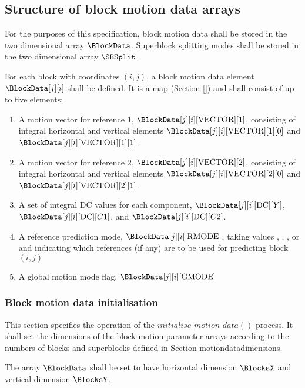 \subsection{Structure of block motion data arrays}

\label{motionconventions}

For the purposes of this specification, block motion data shall be stored in the 
two dimensional array $\BlockData$. Superblock
splitting modes shall be stored in the two dimensional array $\SBSplit$.

For each block with coordinates $(i,j)$, a block motion data element 
$\BlockData[j][i]$ shall be defined. It is a map (Section \ref{}) and shall
consist of up to five elements:

\begin{enumerate}
\item A motion vector for reference 1, $\BlockData[j][i][\Vect][1]$, consisting of 
integral horizontal and vertical elements $\BlockData[j][i][\Vect][1][0]$ and 
$\BlockData[j][i][\Vect][1][1]$.
\item A motion vector for reference 2, $\BlockData[j][i][\Vect][2]$, consisting of 
integral horizontal and vertical elements $\BlockData[j][i][\Vect][2][0]$ and 
$\BlockData[j][i][\Vect][2][1]$.
\item A set of integral DC values for each component, $\BlockData[j][i][\DC][Y]$,
 $\BlockData[j][i][\DC][C1]$, and $\BlockData[j][i][\DC][C2]$.
\item A reference prediction mode, $\BlockData[j][i][\RMode]$, taking values \Intra, 
\RefOneOnly, \RefTwoOnly, or \RefOneAndTwo and indicating which references 
(if any) are to be used for predicting block $(i,j)$
\item A global motion mode flag, $\BlockData[j][i][\GMode]$
\end{enumerate}

\subsubsection{Block motion data initialisation}

\label{motioninit}

This section specifies the operation of the $initialise\_motion\_data()$ process.
 It shall set the dimensions of the block motion parameter arrays according to the numbers
of blocks and superblocks defined in Section {motiondatadimensions}.

The array $\BlockData$ shall be set to have horizontal dimension $\BlocksX$ and 
vertical dimension $\BlocksY$.

